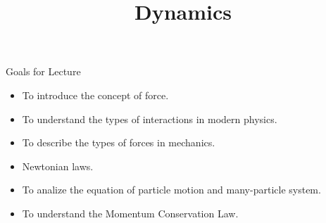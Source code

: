 \documentclass[18pt]{LectMechanics}
\title[Physics 1]{\huge\bfseries Dynamics}
\date{}
\begin{document}
%
\begin{frame}
	\titlepage
\end{frame}
\usebackgroundtemplate{
}




\begin{frame}{Goals for Lecture}{}
	\begin{itemize}
		\item To introduce the concept of force.
		\item To understand the types of interactions in modern physics.
		\item To describe the types of forces in mechanics.
		\item Newtonian laws.
		\item To analize the equation of particle motion and many-particle system.
		\item To understand the Momentum Conservation Law.
	\end{itemize}
\end{frame}
\end{document}

